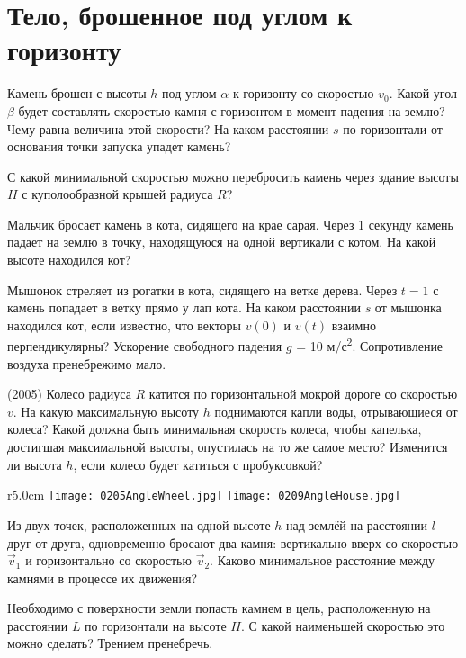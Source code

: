 \section{Тело, брошенное под углом к горизонту}

\AddProb Камень брошен с высоты $h$ под углом $\alpha$ к горизонту  со скоростью $v_0$. 
Какой угол $\beta$ будет составлять скоростью камня с горизонтом в момент падения на землю? Чему равна величина этой скорости? На каком расстоянии $s$ по горизонтали от основания точки запуска упадет камень? 

\AddProb С какой минимальной скоростью можно перебросить камень через здание высоты $H$ с куполообразной крышей радиуса $R$?

\AddProb Мальчик бросает камень в кота, сидящего на крае сарая. Через 1 секунду камень падает на землю в точку, находящуюся на одной вертикали с котом. На какой высоте находился кот?

\AddProb Мышонок стреляет из рогатки в кота, сидящего на ветке дерева. Через $t = 1$ с камень попадает в ветку прямо у лап кота. На каком расстоянии $s$ от мышонка находился кот, если известно, что векторы $v(0)$ и $v(t)$ взаимно перпендикулярны? 
Ускорение свободного падения $g$ = 10 м/с\textsuperscript{2}. Сопротивление воздуха пренебрежимо мало.

\AddProb (2005) Колесо радиуса $R$ катится по горизонтальной мокрой дороге со скоростью $v$. На какую максимальную высоту $h$ поднимаются капли воды, отрывающиеся от колеса? Какой должна быть минимальная скорость колеса, чтобы капелька, достигшая максимальной высоты, опустилась на то же самое место? Изменится ли высота $h$, если колесо будет катиться с пробуксовкой?

\begin{wrapfigure}{r}{5.0cm}
\texttt{[image: 0205AngleWheel.jpg]}
\texttt{[image: 0209AngleHouse.jpg]}
\end{wrapfigure}

\AddProb Из двух точек, расположенных на одной высоте $h$ над землёй на расстоянии $l$ друг от друга, 
одновременно бросают два камня: вертикально вверх со скоростью $\vec{v}_1$ и горизонтально со скоростью $\vec{v}_2$. 
Каково минимальное расстояние между камнями в процессе их движения?

\AddProb Необходимо с поверхности земли попасть камнем в цель, расположенную на расстоянии $L$ по горизонтали на высоте $H$. С какой наименьшей скоростью это можно сделать? Трением пренебречь.

